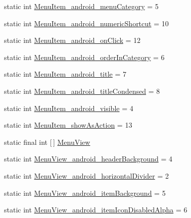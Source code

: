 \begin{DoxyCompactItemize}
\item 
static int \hyperlink{classandroid_1_1support_1_1v7_1_1cardview_1_1R_1_1styleable_ab7b49f654f52bb18770eefb7401b05e6}{Menu\+Item\+\_\+android\+\_\+menu\+Category} = 5
\item 
static int \hyperlink{classandroid_1_1support_1_1v7_1_1cardview_1_1R_1_1styleable_a52bacfc9a0dce455ac562b26db155cc4}{Menu\+Item\+\_\+android\+\_\+numeric\+Shortcut} = 10
\item 
static int \hyperlink{classandroid_1_1support_1_1v7_1_1cardview_1_1R_1_1styleable_aa97c42d3174b202111467c1fe2920610}{Menu\+Item\+\_\+android\+\_\+on\+Click} = 12
\item 
static int \hyperlink{classandroid_1_1support_1_1v7_1_1cardview_1_1R_1_1styleable_ada576758c86c3071f0ebb59174263f7f}{Menu\+Item\+\_\+android\+\_\+order\+In\+Category} = 6
\item 
static int \hyperlink{classandroid_1_1support_1_1v7_1_1cardview_1_1R_1_1styleable_a36a1820cff371662c8af1f52b31283cc}{Menu\+Item\+\_\+android\+\_\+title} = 7
\item 
static int \hyperlink{classandroid_1_1support_1_1v7_1_1cardview_1_1R_1_1styleable_a32c62ba80fc355b96520c8ff294be6ea}{Menu\+Item\+\_\+android\+\_\+title\+Condensed} = 8
\item 
static int \hyperlink{classandroid_1_1support_1_1v7_1_1cardview_1_1R_1_1styleable_a511269a83c8ff86f1563f6ee710e8662}{Menu\+Item\+\_\+android\+\_\+visible} = 4
\item 
static int \hyperlink{classandroid_1_1support_1_1v7_1_1cardview_1_1R_1_1styleable_a5eae947f3c7e674fa7b5cf9b10a4aac4}{Menu\+Item\+\_\+show\+As\+Action} = 13
\item 
static final int \mbox{[}$\,$\mbox{]} \hyperlink{classandroid_1_1support_1_1v7_1_1cardview_1_1R_1_1styleable_aa9f6c3d6d02cac9913617e27d0db7b5f}{Menu\+View}
\item 
static int \hyperlink{classandroid_1_1support_1_1v7_1_1cardview_1_1R_1_1styleable_ad369ecde0cd35828e7b4a9336f071466}{Menu\+View\+\_\+android\+\_\+header\+Background} = 4
\item 
static int \hyperlink{classandroid_1_1support_1_1v7_1_1cardview_1_1R_1_1styleable_a0916d50618f89895e6df0b142231d24a}{Menu\+View\+\_\+android\+\_\+horizontal\+Divider} = 2
\item 
static int \hyperlink{classandroid_1_1support_1_1v7_1_1cardview_1_1R_1_1styleable_a182217b0f7048467ba6a4b0e8a76e75c}{Menu\+View\+\_\+android\+\_\+item\+Background} = 5
\item 
static int \hyperlink{classandroid_1_1support_1_1v7_1_1cardview_1_1R_1_1styleable_acec3ed96639af2fa54857ab78e9bf691}{Menu\+View\+\_\+android\+\_\+item\+Icon\+Disabled\+Alpha} = 6

\end{DoxyCompactItemize}
